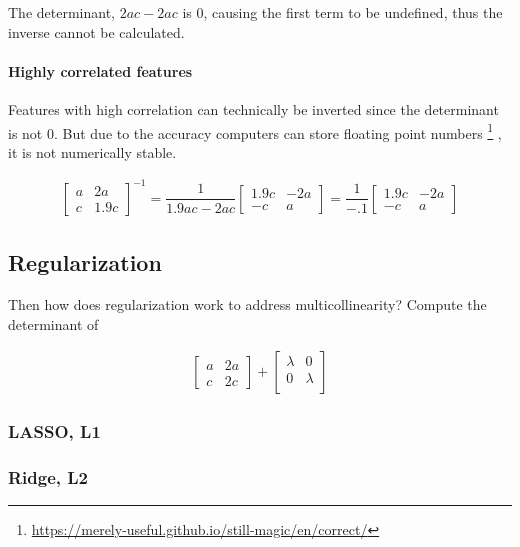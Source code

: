 \documentclass[10pt,letterpaper,twoside]{article}
\begin{document}
The determinant, $2ac - 2ac$ is 0, causing the first term to be undefined,
thus the inverse cannot be calculated.

\paragraph{Highly correlated features}

Features with high correlation can technically be inverted since the determinant is not 0.
But due to the accuracy computers can store floating point numbers
\footnote{\url{https://merely-useful.github.io/still-magic/en/correct/}}
,
it is not numerically stable.

\begin{align}
\begin{bmatrix}
a & 2a \\
c & 1.9c
\end{bmatrix}^{-1}
=
\dfrac{1}{1.9ac - 2ac}
\begin{bmatrix}
1.9c & -2a \\
-c & a
\end{bmatrix}
=
\dfrac{1}{-.1}
\begin{bmatrix}
1.9c & -2a \\
-c & a
\end{bmatrix}
\end{align}

\subsection{Regularization}

Then how does regularization work to address multicollinearity? Compute the determinant of 

\begin{align}
    \begin{bmatrix}
    a & 2a \\
    c & 2c
    \end{bmatrix}
    +
    \begin{bmatrix}
    \lambda & 0 \\
    0 & \lambda \\
    \end{bmatrix}
\end{align}

\subsubsection{LASSO, L1}

\subsubsection{Ridge, L2}
\end{document}
